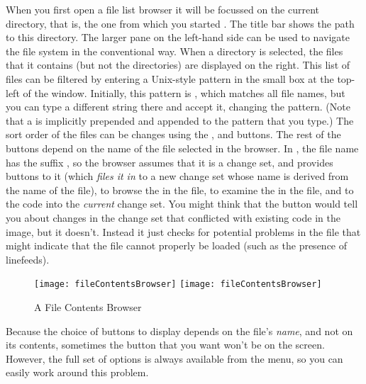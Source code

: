 \documentclass[a4paper,10pt,twoside]{book}
\begin{document}
When you first open a file list browser it will be focussed on the current directory, that is, the one from which you started \sq. The title bar shows the path to this directory.
The larger pane on the left-hand side can be used to navigate the file system in the conventional way.
When a directory is selected, the files that it contains (but not the directories) are displayed on the right.
This list of files can be filtered by entering a Unix-style pattern in the small box at the top-left of the window.  
Initially, this pattern is \ct{*}, which matches all file names, but you can type a different string there and accept it, changing the pattern.  (Note that a \ct{*} is implicitly prepended and appended to the pattern that you type.)
The sort order of the files can be changes using the ,  and  buttons.
The rest of the buttons depend on the name of the file selected in the browser.
In , the file name has the suffix , so the browser assumes that it is a change set, and provides buttons to  it (which \textit{files it in} to a new change set whose name is derived from the name of the file),  to browse the  in the file, to examine the  in the file, 
and to  the code into the \emph{current} change set.
You might think that the  button would tell you about changes in the change set that conflicted with existing code in the image, but it doesn't.
Instead it just checks for potential problems in the file that might indicate that the file cannot properly be loaded (such as the presence of linefeeds).

\begin{figure}[btp]
	\begin{center}
	\ifluluelse
		{\texttt{[image: fileContentsBrowser]}}
		{\texttt{[image: fileContentsBrowser]}}
	\end{center}
	\caption{A File Contents Browser}
	\label{fig:fileContentsBrowser}
\end{figure}

Because the choice of buttons to display depends on the file's \emph{name}, and not on its contents, sometimes the button that you want won't be on the screen.  
However, the full set of options is always available from the   menu, so
you can easily work around this problem.
\end{document}

